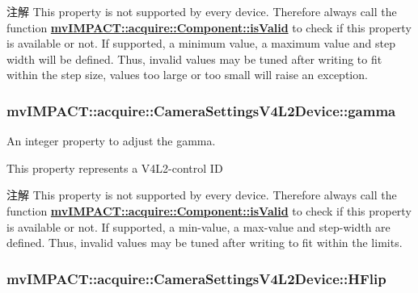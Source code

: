 \begin{DoxyNote}{注解}
This property is not supported by every device. Therefore always call the function {\bfseries \hyperlink{classmv_i_m_p_a_c_t_1_1acquire_1_1_component_ac51e55e7e046101f3c6119d84123abd5}{mv\+I\+M\+P\+A\+C\+T\+::acquire\+::\+Component\+::is\+Valid}} to check if this property is available or not. If supported, a minimum value, a maximum value and step width will be defined. Thus, invalid values may be tuned after writing to fit within the step size, values too large or too small will raise an exception. 
\end{DoxyNote}
\hypertarget{classmv_i_m_p_a_c_t_1_1acquire_1_1_camera_settings_v4_l2_device_ac5c2d70d509d427ceba37d2d179736e3}{
\subsubsection[{gamma}]{ mv\+I\+M\+P\+A\+C\+T\+::acquire\+::\+Camera\+Settings\+V4\+L2\+Device\+::gamma}}\label{classmv_i_m_p_a_c_t_1_1acquire_1_1_camera_settings_v4_l2_device_ac5c2d70d509d427ceba37d2d179736e3}


An integer property to adjust the gamma. 

This property represents a V4\+L2-\/control I\+D \begin{DoxyNote}{注解}
This property is not supported by every device. Therefore always call the function {\bfseries \hyperlink{classmv_i_m_p_a_c_t_1_1acquire_1_1_component_ac51e55e7e046101f3c6119d84123abd5}{mv\+I\+M\+P\+A\+C\+T\+::acquire\+::\+Component\+::is\+Valid}} to check if this property is available or not. If supported, a min-\/value, a max-\/value and step-\/width are defined. Thus, invalid values may be tuned after writing to fit within the limits. 
\end{DoxyNote}
\hypertarget{classmv_i_m_p_a_c_t_1_1acquire_1_1_camera_settings_v4_l2_device_aae2c24949f727feab82dd57e216445b3}{
\subsubsection[{H\+Flip}]{ mv\+I\+M\+P\+A\+C\+T\+::acquire\+::\+Camera\+Settings\+V4\+L2\+Device\+::\+H\+Flip}}\label{classmv_i_m_p_a_c_t_1_1acquire_1_1_camera_settings_v4_l2_device_aae2c24949f727feab82dd57e216445b3}


